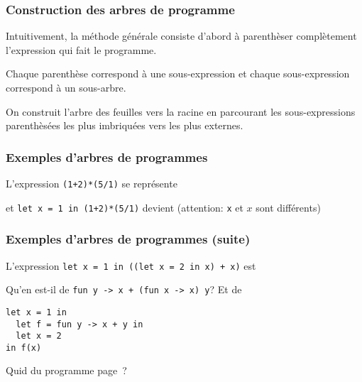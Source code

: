 %
\begin{frame}
\frametitle{Construction des arbres de programme}

Intuitivement, la méthode générale consiste d'abord à parenthèser
complètement l'expression qui fait le programme.

\bigskip

\noindent Chaque parenthèse correspond à une sous-expression et chaque
sous-expression correspond à un sous-arbre.

\bigskip

On construit l'arbre des feuilles vers la racine en parcourant les
sous-expressions parenthèsées les plus imbriquées vers les plus
externes.

\end{frame}

%
\begin{frame}[containsverbatim]
\frametitle{Exemples d'arbres de programmes}

L'expression \verb|(1+2)*(5/1)| se représente
    {\small
    \begin{center}
    \end{center}
    }
et \verb|let x = 1 in (1+2)*(5/1)| devient (attention: \verb+x+ et $x$
sont différents) 
    {\small
    \begin{center}
    \end{center}
    }

\end{frame}

%
\begin{frame}[containsverbatim]
\frametitle{Exemples d'arbres de programmes (suite)}
\label{exemples_arbres_suite}

L'expression \verb|let x = 1 in ((let x = 2 in x) + x)| est
{\small
\begin{center}
\end{center}
}
Qu'en est-il de \verb|fun y -> x + (fun x -> x) y|? Et de
{\small
\begin{verbatim}
let x = 1 in
  let f = fun y -> x + y in
  let x = 2
in f(x)
\end{verbatim}
}
Quid du programme page~\pageref{un_autre_programme}?

\end{frame}

